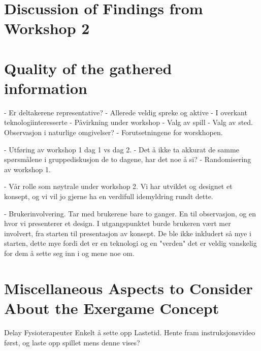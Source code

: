 \section{Discussion of Findings from Workshop 2}

\section{Quality of the gathered information}
- Er deltakerene representative?
	- Allerede veldig spreke og aktive
	- I overkant teknologiinteresserte
- Påvirkning under workshop
- Valg av spill
- Valg av sted. Observasjon i naturlige omgivelser?
- Forutsetningene for worskhopen. 

- Utføring av workshop 1 dag 1 vs dag 2.
- Det å ikke ta akkurat de samme spørsmålene i gruppediskusjon de to dagene, har det noe å si?
- Randomisering av workshop 1. 

- Vår rolle som nøytrale under workshop 2. Vi har utviklet og designet et konsept, og vi vil jo gjerne ha en verdifull idemyldring rundt dette.  

- Brukerinvolvering. Tar med brukerene bare to ganger. En til observasjon, og en hvor vi presenterer et design. I utgangspunktet burde brukeren vært mer involvert, fra starten til presentasjon av konsept. De ble ikke inkludert så mye i starten, dette mye fordi det er en teknologi og en "verden" det er veldig vanskelig for dem å sette seg inn i og mene noe om. 


\section{Miscellaneous Aspects to Consider About the Exergame Concept}
\label{sec:misc}

Delay
Fysioterapeuter
Enkelt å sette opp
Lastetid. Hente fram instruksjonsvideo først, og laste opp spillet mens denne vises?

